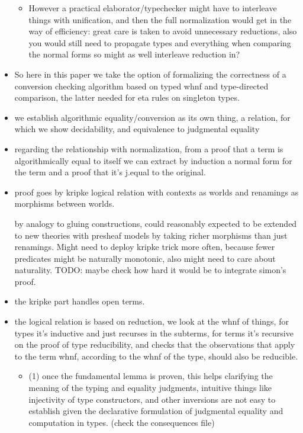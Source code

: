 \documentclass{book}
\begin{document}
\begin{itemize}
\begin{itemize}
   \item However a practical elaborator/typechecker might have to
   interleave things with unification, and then the full normalization
   would get in the way of efficiency: great care is taken to avoid
   unnecessary reductions, also you would still need to propagate
   types and everything when comparing the normal forms so might as
   well interleave reduction in?
   \end{itemize}

 \item So here in this paper we take the option of formalizing the
 correctness of a conversion checking algorithm based on typed whnf and
 type-directed comparison, the latter needed for eta rules on singleton types.

 \item we establish algorithmic equality/conversion as its own thing, a
 relation, for which we show decidability, and equivalence to
 judgmental equality

 \item regarding the relationship with normalization, from a proof that a
 term is algorithmically equal to itself we can extract by induction a
 normal form for the term and a proof that it's j.equal to the
 original.

 \item proof goes by kripke logical relation with contexts as worlds and renamings as morphisms between worlds.
 
   by analogy to gluing constructions, could reasonably expected to
   be extended to new theories with presheaf models by taking richer
   morphisms than just renamings.
   Might need to deploy kripke trick more often, because fewer
   predicates might be naturally monotonic, also might need to care
   about naturality.
   TODO: maybe check how hard it would be to integrate simon's proof.

 \item the kripke part handles open terms.
   
 \item the logical relation is based on reduction, we look at the whnf of
 things, for types it's inductive and just recurses in the subterms,
 for terms it's recursive on the proof of type reducibility, and checks that
 the observations that apply to the term whnf, according to the whnf of
 the type, should also be reducible.
   \begin{itemize}
   \item (1) once the fundamental lemma is proven, this helps clarifying
     the meaning of the typing and equality
     judgments, intuitive things like injectivity of type constructors,
     and other inversions are not easy to establish given
     the declarative formulation of judgmental equality
     and computation in types. (check the consequences file)
 

\end{itemize}
\end{itemize}
\end{document}
